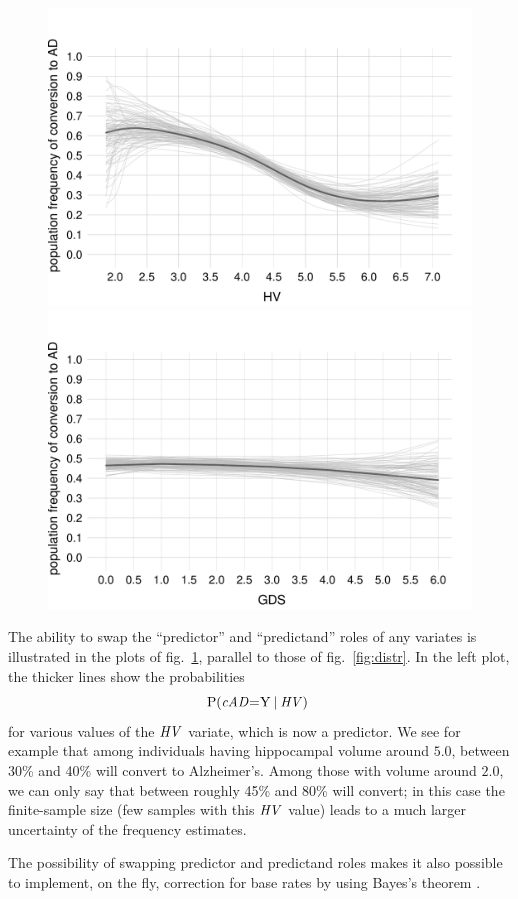 \begin{figure}[t]
\centering%
\includegraphics[width=0.45\linewidth]{figures/prob_conversion_HV.pdf}\hfill%
\includegraphics[width=0.45\linewidth]{figures/prob_conversion_GDS.pdf}%
\\ \caption{}\label{fig:distr_inv}
\end{figure}
The ability to swap the ``predictor'' and ``predictand'' roles of any variates is illustrated in the plots of fig.~\ref{fig:distr_inv}, parallel to those of fig.~\ref{fig:distr}. In the left plot, the thicker lines show the probabilities
\begin{equation*}
  \P( \cAD \mo \yy \| \HV)\
\end{equation*}
for various values of the $\mathit{HV}$ variate, which is now a predictor.
We see for example that among individuals having hippocampal volume around $5.0$, between 30\% and 40\% will convert to Alzheimer's. Among those with volume around $2.0$, we can only say that between roughly 45\% and 80\% will convert; in this case the finite-sample size (few samples with this $\mathit{HV}$ value) leads to a much larger uncertainty of the frequency estimates.

The possibility of swapping predictor and predictand roles makes it also possible to implement, on the fly, correction for base rates by using Bayes's theorem \cite[\S\,4]{lindleyetal1981}.%

\medskip

